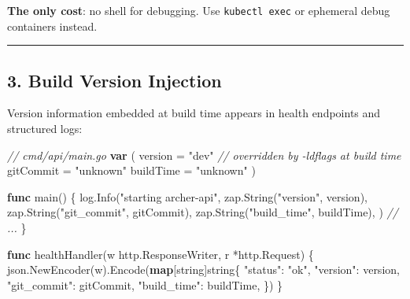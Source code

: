\documentclass[
]{article}
\newenvironment{Shaded}{}{}
\newcommand{\CommentTok}[1]{\textcolor[rgb]{0.38,0.63,0.69}{\textit{#1}}}
\newcommand{\DataTypeTok}[1]{\textcolor[rgb]{0.56,0.13,0.00}{#1}}
\newcommand{\KeywordTok}[1]{\textcolor[rgb]{0.00,0.44,0.13}{\textbf{#1}}}
\newcommand{\NormalTok}[1]{#1}
\newcommand{\OperatorTok}[1]{\textcolor[rgb]{0.40,0.40,0.40}{#1}}
\newcommand{\StringTok}[1]{\textcolor[rgb]{0.25,0.44,0.63}{#1}}
\begin{document}
\textbf{The only cost}: no shell for debugging. Use
\texttt{kubectl\ exec} or ephemeral debug containers instead.

\begin{center}\rule{0.5\linewidth}{0.5pt}\end{center}

\hypertarget{build-version-injection}{%
\subsection{3. Build Version Injection}\label{build-version-injection}}

Version information embedded at build time appears in health endpoints
and structured logs:

\begin{Shaded}
\begin{Highlighting}[]
\CommentTok{// cmd/api/main.go}
\KeywordTok{var} \OperatorTok{(}
\NormalTok{    version   }\OperatorTok{=} \StringTok{"dev"}     \CommentTok{// overridden by {-}ldflags at build time}
\NormalTok{    gitCommit }\OperatorTok{=} \StringTok{"unknown"}
\NormalTok{    buildTime }\OperatorTok{=} \StringTok{"unknown"}
\OperatorTok{)}

\KeywordTok{func}\NormalTok{ main}\OperatorTok{()} \OperatorTok{\{}
\NormalTok{    log}\OperatorTok{.}\NormalTok{Info}\OperatorTok{(}\StringTok{"starting archer{-}api"}\OperatorTok{,}
\NormalTok{        zap}\OperatorTok{.}\NormalTok{String}\OperatorTok{(}\StringTok{"version"}\OperatorTok{,}\NormalTok{ version}\OperatorTok{),}
\NormalTok{        zap}\OperatorTok{.}\NormalTok{String}\OperatorTok{(}\StringTok{"git\_commit"}\OperatorTok{,}\NormalTok{ gitCommit}\OperatorTok{),}
\NormalTok{        zap}\OperatorTok{.}\NormalTok{String}\OperatorTok{(}\StringTok{"build\_time"}\OperatorTok{,}\NormalTok{ buildTime}\OperatorTok{),}
    \OperatorTok{)}
    \CommentTok{// ...}
\OperatorTok{\}}

\KeywordTok{func}\NormalTok{ healthHandler}\OperatorTok{(}\NormalTok{w http}\OperatorTok{.}\NormalTok{ResponseWriter}\OperatorTok{,}\NormalTok{ r }\OperatorTok{*}\NormalTok{http}\OperatorTok{.}\NormalTok{Request}\OperatorTok{)} \OperatorTok{\{}
\NormalTok{    json}\OperatorTok{.}\NormalTok{NewEncoder}\OperatorTok{(}\NormalTok{w}\OperatorTok{).}\NormalTok{Encode}\OperatorTok{(}\KeywordTok{map}\OperatorTok{[}\DataTypeTok{string}\OperatorTok{]}\DataTypeTok{string}\OperatorTok{\{}
        \StringTok{"status"}\OperatorTok{:}     \StringTok{"ok"}\OperatorTok{,}
        \StringTok{"version"}\OperatorTok{:}\NormalTok{    version}\OperatorTok{,}
        \StringTok{"git\_commit"}\OperatorTok{:}\NormalTok{ gitCommit}\OperatorTok{,}
        \StringTok{"build\_time"}\OperatorTok{:}\NormalTok{ buildTime}\OperatorTok{,}
    \OperatorTok{\})}
\OperatorTok{\}}
\end{Highlighting}
\end{Shaded}
\end{document}

